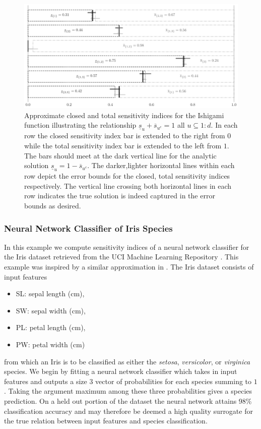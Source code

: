 \documentclass{article}[12pt]
\begin{document}
\begin{figure}[H]
    \centering
    \includegraphics[width=.8\textwidth]{figs/ishigami.pdf}
    \caption{Approximate closed and total sensitivity indices for the Ishigami function illustrating the relationship $\underline{s}_u + \overline{s}_{u^c} = 1$ all $u \subseteq 1:d$. In each row the closed sensitivity index bar is  extended to the right from $0$ while the total sensitivity index bar is extended to the left from $1$. The bars should meet at the dark vertical line for the  analytic solution $\underline{s}_u=1-\overline{s}_{u^c}$. The darker,lighter horizontal lines within each row depict the error bounds for the closed, total sensitivity indices respectively. The vertical line crossing both horizontal lines in each row indicates the true solution is indeed captured in the error bounds as desired.}
    \label{fig:ishigami}
\end{figure}

\subsubsection{Neural Network Classifier of Iris Species}

In this example we compute sensitivity indices of a neural network classifier for the Iris dataset retrieved from the UCI Machine Learning Repository \cite{uci_ml_repo}. This example was inspired by a similar approximation in \cite{hoyt2021efficient}. The Iris dataset consists of input features
\begin{itemize}
    \item SL: sepal length (cm),
    \item SW: sepal width (cm),
    \item PL: petal length (cm),
    \item PW: petal width (cm)
\end{itemize}
from which an Iris is to be classified as either the \emph{setosa}, \emph{versicolor}, or \emph{virginica} species. We begin by fitting a neural network classifier \cite{he2015delving} which takes in input features and outputs a size $3$ vector of probabilities for each species summing to $1$. Taking the argument maximum among these three probabilities gives a species prediction. On a held out portion of the dataset the neural network attains 98\% classification accuracy and may therefore be deemed a high quality surrogate for the true relation between input features and species classification. 
\end{document}
